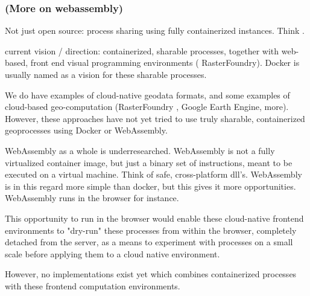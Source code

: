 \subsubsection{(More on webassembly)}

Not just open source: process sharing using fully containerized instances. Think .

current vision / direction: containerized, sharable processes, together with web-based, front end visual programming environments ( RasterFoundry). Docker is usually named as a vision for these sharable processes.

\m{->} We do have examples of cloud-native geodata formats, and some examples of cloud-based geo-computation (RasterFoundry , Google Earth Engine, more). However, these approaches have not yet tried to use truly sharable, containerized geoprocesses using Docker or WebAssembly. 

\m{->} WebAssembly as a whole is underresearched. WebAssembly is not a fully virtualized container image, but just a binary set of instructions, meant to be executed on a virtual machine. Think of safe, cross-platform dll's. 
WebAssembly is in this regard more simple than docker, but this gives it more opportunities. 
WebAssembly runs in the browser for instance. 

\m{->} This opportunity to run in the browser would enable these cloud-native frontend environments to "dry-run" these processes from within the browser, completely detached from the server, as a means to experiment with processes on a small scale before applying them to a cloud native environment. 

\m{->} However, no implementations exist yet which combines containerized processes with these frontend computation environments. 








